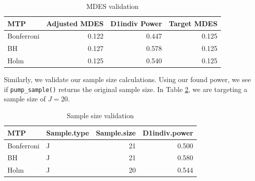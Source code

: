 \documentclass[
]{article}
\begin{document}
\begin{table}[h!]
\centering
\begin{tabular}{lrrr}
\toprule
MTP & Adjusted MDES & D1indiv Power & Target MDES\\
\midrule
Bonferroni & 0.122 & 0.447 & 0.125\\
BH & 0.127 & 0.578 & 0.125\\
Holm & 0.125 & 0.540 & 0.125\\
\bottomrule
\end{tabular}
\label{tab:mdes}
\caption{MDES validation}
\end{table}

Similarly, we validate our sample size calculations. Using our found
power, we see if \texttt{pump\_sample()} returns the original sample
size. In Table \ref{tab:ss}, we are targeting a sample size of
\(J = 20\).

\begin{table}[h!]
\centering
\begin{tabular}{llrr}
\toprule
MTP & Sample.type & Sample.size & D1indiv.power\\
\midrule
Bonferroni & J & 21 & 0.500\\
BH & J & 21 & 0.580\\
Holm & J & 20 & 0.544\\
\bottomrule
\end{tabular}
\label{tab:ss}
\caption{Sample size validation}
\end{table}
\end{document}
